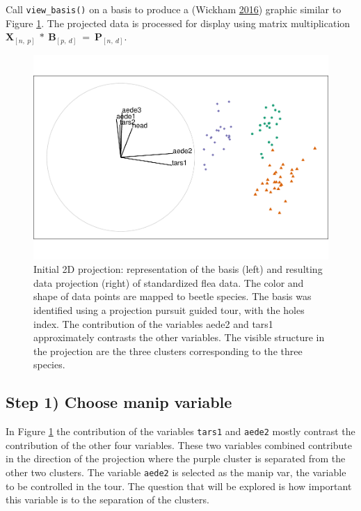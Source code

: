 Call \texttt{view\_basis()} on a basis to produce a 
(Wickham \protect\hyperlink{ref-wickham_ggplot2:_2016}{2016}) graphic
similar to Figure \ref{fig:step0}. The projected data is processed for
display using matrix multiplication
\(\textbf{X}_{[n,~p]} ~*~ \textbf{B}_{[p,~d]} ~=~ \textbf{P}_{[n,~d]}\).

\begin{Schunk}
\begin{figure}

{\centering \includegraphics[width=0.7\linewidth]{spinifex_paper_files/figure-latex/step0-1} 

}

\caption[Initial 2D projection]{Initial 2D projection: representation of the basis  (left) and resulting data projection (right) of standardized flea data. The color and shape of data points are mapped to beetle species. The basis was identified using a projection pursuit guided tour, with the holes index. The contribution of the variables aede2 and tars1 approximately contrasts the other variables. The visible structure in the projection are the three clusters corresponding to the three species.}\label{fig:step0}
\end{figure}
\end{Schunk}

\hypertarget{step-1-choose-manip-variable}{%
\subsection{Step 1) Choose manip
variable}\label{step-1-choose-manip-variable}}

In Figure \ref{fig:step0} the contribution of the variables
\texttt{tars1} and \texttt{aede2} mostly contrast the contribution of
the other four variables. These two variables combined contribute in the
direction of the projection where the purple cluster is separated from
the other two clusters. The variable \texttt{aede2} is selected as the
manip var, the variable to be controlled in the tour. The question that
will be explored is how important this variable is to the separation of
the clusters.

